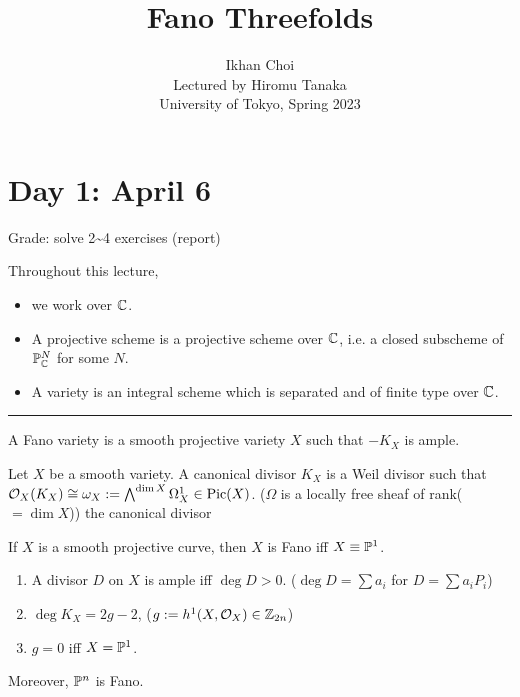 \documentclass{../../small}
\DeclareMathOperator{\Pic}{Pic}
\begin{document}
\title{Fano Threefolds}
\author{Ikhan Choi\\Lectured by Hiromu Tanaka\\University of Tokyo, Spring 2023}
\maketitle
\tableofcontents

\newpage
\section{Day 1: April 6}

Grade: solve 2\sim4 exercises (report)

Throughout this lecture,
\begin{itemize}
\item we work over $\C$.
\item A projective scheme is a projective scheme over $\C$, i.e. a closed subscheme of $\P_\C^N$ for some $N$.
\item A variety is an integral scheme which is separated and of finite type over $\C$.
\end{itemize}


\smallskip\hrule

\begin{defn}
A Fano variety is a smooth projective variety $X$ such that $-K_X$ is ample.
\end{defn}
\begin{defn}
Let $X$ be a smooth variety.
A canonical divisor $K_X$ is a Weil divisor such that $\cO_X(K_X)\cong\omega_X:=\bigwedge^{\dim X}\Omega_X^1\in\Pic(X)$.
($\Omega$ is a locally free sheaf of rank($=\dim X$))
the canonical divisor
\end{defn}

\begin{ex}
If $X$ is a smooth projective curve, then $X$ is Fano iff $X\equiv\P^1$.
\end{ex}
\begin{pf}
\begin{enumerate}
\item A divisor $D$ on $X$ is ample iff $\deg D>0$.
($\deg D=\sum a_i$ for $D=\sum a_iP_i$)
\item $\deg K_X=2g-2$, ($g:=h^1(X,\cO_X)\in\Z_{2n}$)
\item $g=0$ iff $X=\P^1$.
\end{enumerate}
Moreover, $\P^n$ is Fano.
\end{pf}
\end{document}
